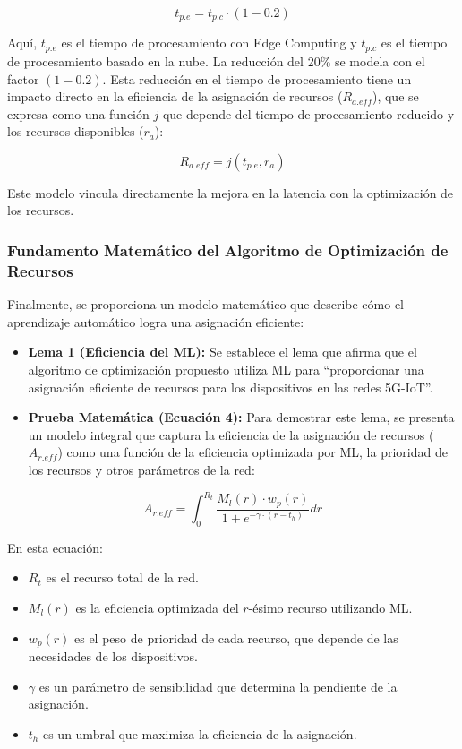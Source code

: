 \documentclass[12pt,a4paper]{article}
\begin{document}
\begin{equation}
t_{p.e} = t_{p.c} \cdot (1 - 0.2)
\end{equation}

Aquí, $t_{p.e}$ es el tiempo de procesamiento con Edge Computing y $t_{p.c}$ es el tiempo de procesamiento basado en la nube. La reducción del 20\% se modela con el factor $(1-0.2)$. Esta reducción en el tiempo de procesamiento tiene un impacto directo en la eficiencia de la asignación de recursos ($R_{a.eff}$), que se expresa como una función $j$ que depende del tiempo de procesamiento reducido y los recursos disponibles ($r_a$):

\begin{equation}
R_{a.eff} = j(t_{p.e}, r_a)
\end{equation}

Este modelo vincula directamente la mejora en la latencia con la optimización de los recursos.

\subsubsection{Fundamento Matemático del Algoritmo de Optimización de Recursos}

Finalmente, se proporciona un modelo matemático que describe cómo el aprendizaje automático logra una asignación eficiente:

\begin{itemize}
    \item \textbf{Lema 1 (Eficiencia del ML):} Se establece el lema que afirma que el algoritmo de optimización propuesto utiliza ML para ``proporcionar una asignación eficiente de recursos para los dispositivos en las redes 5G-IoT''.
    
    \item \textbf{Prueba Matemática (Ecuación 4):} Para demostrar este lema, se presenta un modelo integral que captura la eficiencia de la asignación de recursos ($A_{r.eff}$) como una función de la eficiencia optimizada por ML, la prioridad de los recursos y otros parámetros de la red:
\end{itemize}

\begin{equation}
A_{r.eff} = \int_0^{R_t} \frac{M_l(r) \cdot w_p(r)}{1 + e^{-\gamma \cdot (r - t_h)}} dr
\end{equation}

En esta ecuación:
\begin{itemize}
    \item $R_t$ es el recurso total de la red.
    \item $M_l(r)$ es la eficiencia optimizada del $r$-ésimo recurso utilizando ML.
    \item $w_p(r)$ es el peso de prioridad de cada recurso, que depende de las necesidades de los dispositivos.
    \item $\gamma$ es un parámetro de sensibilidad que determina la pendiente de la asignación.
    \item $t_h$ es un umbral que maximiza la eficiencia de la asignación.
\end{itemize}
\end{document}
